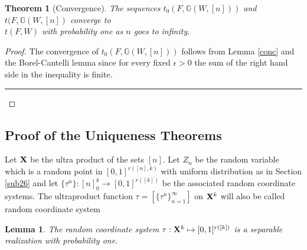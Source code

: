 \documentclass [11pt] {article}
\newcommand{\qed} {\hspace {0.1in} \rule {1.5mm} {3.5mm}}
\newtheorem{lemma}{Lemma}[section]
\newtheorem{theorem}{Theorem}
\def\to{\rightarrow}
\def\xo{{\bf X}}
\begin{document}
\begin{theorem}[Convergence]\label{asconv} The sequences 
$t_0(F,\mathbb{G}(W,[n]))$ and $t(F,\mathbb{G}(W,[n])$ 
converge to \\ $t(F,W)$ with probability one as $n$ goes to infinity.
\end{theorem}

\begin{proof} The convergence of $t_0(F,\mathbb{G}(W,[n]))$ follows from Lemma
  \ref{conc} and the Borel-Cantelli lemma since for every
 fixed $\epsilon>0$ the sum of the right hand side in the inequality is finite.
\qed
\end{proof}






\subsection{Proof of the Uniqueness Theorems}

Let $\xo$ be the ultra product of the sets $[n]$. Let $Z_n$ be the random
variable which is a random point in $[0,1]^{r([n],k)}$ 
with uniform distribution as in Section \ref{sub26} and let $\{\tau^n\}:
[n]_0^k\to [0,1]^{r([k])}$ be the associated random coordinate systems.
The ultraproduct function $\tau=[\{\tau^n\}_{n=1}^\infty]$ on $\xo^k$ 
will also be called random coordinate system


\begin{lemma}\label{randcorsep} The random coordinate system 
$\tau:\xo^k\mapsto [0,1]^{r([k])}$ is a separable realization with
 probability one.
\end{lemma}
\end{document}
